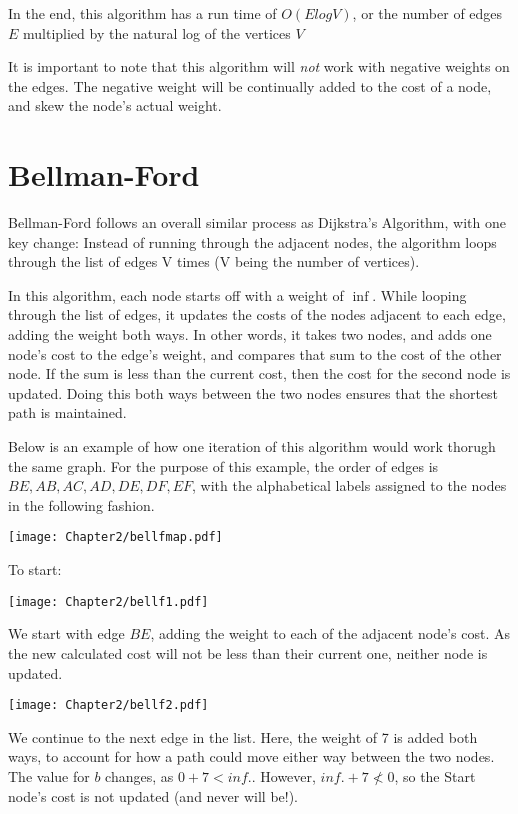 In the end, this algorithm has a run time of $O(E log V)$, or the number of edges $E$ multiplied by the natural log of the vertices $V$

It is important to note that this algorithm will \emph{not} work with negative weights on the edges. The negative weight will be continually added to the cost of a node, and skew the node's actual weight.


\section{Bellman-Ford}

Bellman-Ford follows an overall similar process as Dijkstra's Algorithm, with one key change: Instead of running through the adjacent nodes, the algorithm loops through the list of edges V times (V being the number of vertices). 

In this algorithm, each node starts off with a weight of $\inf$. While looping through the list of edges, it updates the costs of the nodes adjacent to each edge, adding the weight both ways. In other words, it takes two nodes, and adds one node's cost to the edge's weight, and compares that sum to the cost of the other node. If the sum is less than the current cost, then the cost for the second node is updated. Doing this both ways between the two nodes ensures that the shortest path is maintained.

Below is an example of how one iteration of this algorithm would work thorugh the same graph. For the purpose of this example, the order of edges is $BE, AB, AC, AD, DE, DF, EF$, with the alphabetical labels assigned to the nodes in the following fashion.


\begin{center}
\texttt{[image: Chapter2/bellfmap.pdf]}
\end{center}

To start:

\begin{center}
\texttt{[image: Chapter2/bellf1.pdf]}
\end{center}
We start with edge $BE$, adding the weight to each of the adjacent node's cost. As the new calculated cost will not be less than their current one, neither node is updated.


\begin{center}
\texttt{[image: Chapter2/bellf2.pdf]}
\end{center}
We continue to the next edge in the list. Here, the weight of 7 is added both ways, to account for how a path could move either way between the two nodes. The value for $b$ changes, as $0 + 7 < inf.$. However, $inf. + 7 \nless0$, so the Start node's cost is not updated (and never will be!).

